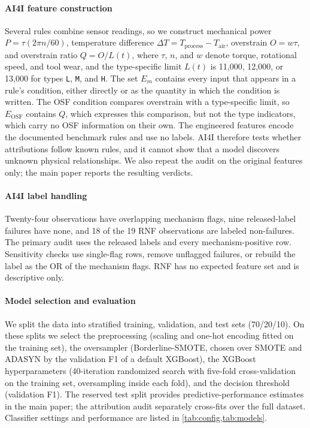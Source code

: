 \documentclass[10pt]{article}
\begin{document}
\paragraph{AI4I feature construction} Several rules combine sensor readings, so we construct mechanical power
$P=\tau(2\pi n/60)$, temperature difference
$\Delta T=T_{\mathrm{process}}-T_{\mathrm{air}}$,
overstrain $O=w\tau$, and overstrain ratio $Q=O/L(t)$,
where $\tau$, $n$, and $w$ denote torque, rotational speed,
and tool wear, and the type-specific limit $L(t)$
is 11{,}000, 12{,}000, or 13{,}000 for types
\texttt{L}, \texttt{M}, and \texttt{H}. The set $E_m$ contains every input that appears in a rule's condition, either directly or as the quantity in which the condition is written. The OSF condition compares overstrain with a type-specific limit, so $E_{\mathrm{OSF}}$ contains $Q$, which expresses this comparison, but not the type indicators, which carry no OSF information on their own. The engineered features encode the documented benchmark rules and use no labels. AI4I therefore tests whether attributions follow known rules, and it cannot show that a model discovers unknown physical relationships. We also repeat the audit on the original features only; the main paper reports the resulting verdicts.


\paragraph{AI4I label handling} Twenty-four observations have overlapping mechanism flags, nine released-label failures have none, and 18 of the 19 RNF observations are labeled non-failures. The primary audit uses the released labels and every mechanism-positive row. Sensitivity checks use single-flag rows, remove unflagged failures, or rebuild the label as the OR of the mechanism flags. RNF has no expected feature set and is descriptive only.

\paragraph{Model selection and evaluation} We split the data into stratified training, validation, and test sets (70/20/10). On these splits we select the preprocessing (scaling and one-hot encoding fitted on the training set), the oversampler (Borderline-SMOTE, chosen over SMOTE and ADASYN by the validation F1 of a default XGBoost), the XGBoost hyperparameters (40-iteration randomized search with five-fold cross-validation on the training set, oversampling inside each fold), and the decision threshold (validation F1). The reserved test split provides predictive-performance estimates in the main paper; the attribution audit separately cross-fits over the full dataset. Classifier settings and performance are listed in \cref{tab:config,tab:models}.
\end{document}
